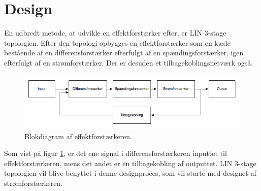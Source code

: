 \section{Design}
En udbredt metode, at udvikle en effektforstærker efter, er LIN 3-stage topologien. Efter den topologi opbygges en effektforstærker som en kæde bestående af en differensforstærker efterfulgt af en spændingsforstærker, igen efterfulgt af en strømforstærker. Der er desuden et tilbagekoblingsnetværk også. 

\begin{figure}[h]
\centering
\includegraphics[scale=0.5]{teknisk/effektforstaerker/blokdiagram-effektforstaerker.png}
\caption{Blokdiagram af effektforstærkeren.}
\label{fig:lin_effektforstaerker}
\end{figure}

Som vist på figur \ref{fig:lin_effektforstaerker}, er det ene signal i differensforstærkeren inputtet til effektforstærkeren, mens det andet er en tilbagekobling af outputtet. LIN 3-stage topologien vil blive benyttet i denne designproces, som vil starte med designet af strømforstærkeren. 